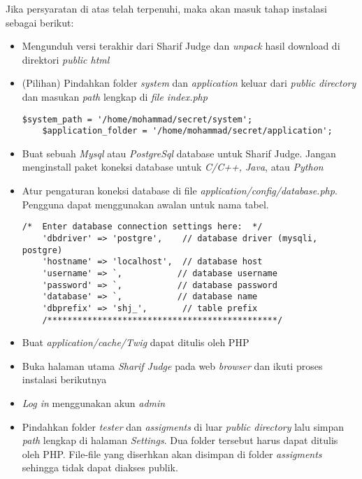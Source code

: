 Jika persyaratan di atas telah terpenuhi, maka akan masuk tahap instalasi sebagai berikut:
\begin{itemize}
	\item Mengunduh versi terakhir dari Sharif Judge dan \textit{unpack} hasil download di direktori \textit{public html}
	\item (Pilihan) Pindahkan folder \textit{system} dan \textit{application} keluar dari \textit{public directory} dan
	masukan \textit{path} lengkap di \textit{file index.php} 
	\begin{lstlisting}[backgroundcolor = \color{lightgray}]
	$system_path = '/home/mohammad/secret/system';
	$application_folder = '/home/mohammad/secret/application';
	\end{lstlisting}
	\item Buat sebuah \textit{Mysql} atau \textit{PostgreSql} database untuk Sharif Judge. Jangan menginstall paket koneksi database untuk \textit{C/C++, Java}, atau \textit{Python}
	\item Atur pengaturan koneksi database di file \textit{application/config/database.php}. Pengguna dapat menggunakan awalan untuk nama tabel.
	\begin{lstlisting}[backgroundcolor = \color{lightgray}]
	/*  Enter database connection settings here:  */
	'dbdriver' => 'postgre',    // database driver (mysqli, postgre)
	'hostname' => 'localhost',  // database host
	'username' => `,           // database username
	'password' => `,           // database password
	'database' => `,           // database name
	'dbprefix' => 'shj_',       // table prefix
	/**********************************************/
	\end{lstlisting}
	\item Buat \textit{application/cache/Twig} dapat ditulis oleh PHP
	\item Buka halaman utama \textit{Sharif Judge} pada web \textit{browser} dan ikuti proses instalasi berikutnya
	\item \textit{Log in} menggunakan akun \textit{admin}
	\item Pindahkan folder \textit{tester} dan \textit{assigments} di luar \textit{public directory} lalu simpan \textit{path} lengkap di halaman \textit{Settings}. Dua folder tersebut harus dapat ditulis oleh PHP. File-file yang diserhkan akan disimpan di folder \textit{assigments} sehingga tidak dapat diakses publik.
\end{itemize}

